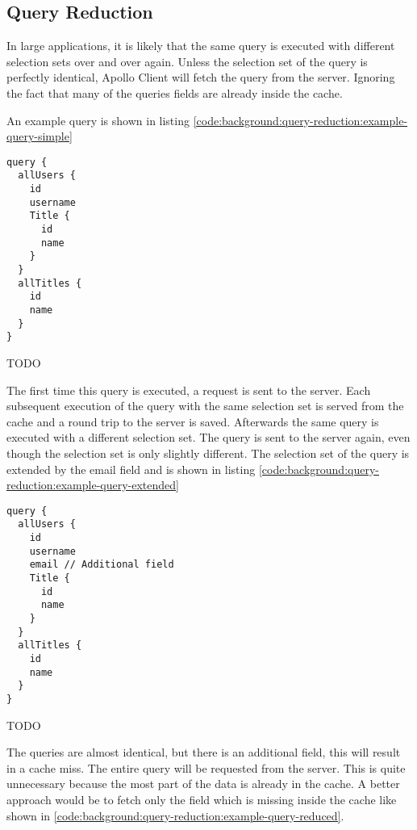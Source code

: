 \subsection{Query Reduction}

In large applications, it is likely that the same query is executed with different selection sets over and over again. Unless the selection set of the query is perfectly identical, Apollo Client will fetch the query from the server. Ignoring the fact that many of the queries fields are already inside the cache.

An example query is shown in listing \ref{code:background:query-reduction:example-query-simple}

\ifshowListings
\begin{listing}[H]
\begin{verbatim}
query {
  allUsers {
    id
    username
    Title {
      id
      name
    }
  }
  allTitles {
    id
    name
  }
}
\end{verbatim}
\caption{TODO}\label{code:background:query-reduction:example-query-simple}
\end{listing}
\fi

The first time this query is executed, a request is sent to the server. Each subsequent execution of the query with the same selection set is served from the cache and a round trip to the server is saved. Afterwards the same query is executed with a different selection set. The query is sent to the server again, even though the selection set is only slightly different. The selection set of the query is extended by the email field and is shown in listing \ref{code:background:query-reduction:example-query-extended}

\ifshowListings
\begin{listing}[H]
\begin{verbatim}
query {
  allUsers {
    id
    username
    email // Additional field
    Title {
      id
      name
    }
  }
  allTitles {
    id
    name
  }
}
\end{verbatim}
\caption{TODO}\label{code:background:query-reduction:example-query-extended}
\end{listing}
\fi

The queries are almost identical, but there is an additional field, this will result in a cache miss. The entire query will be requested from the server. This is quite unnecessary because the most part of the data is already in the cache. A better approach would be to fetch only the field which is missing inside the cache like shown in \ref{code:background:query-reduction:example-query-reduced}.

